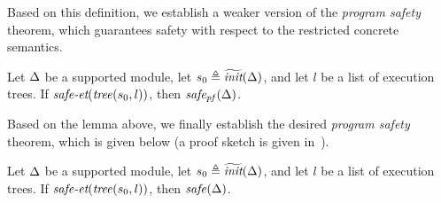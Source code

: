 Based on this definition,
we establish a weaker version of the \emph{program safety} theorem,
which guarantees safety with respect to the restricted concrete semantics.

\begin{lemma}
\label{lemma:safety-via-et-strict-ns}
Let $\Delta$ be a supported module, let $s_0 \triangleq \widetilde{\textit{init}}(\Delta)$, and let $l$ be a list of execution trees.
If $\textit{safe-et}(\mathit{tree}(s_0, l))$, then $\mathit{safe_{pf}}(\Delta)$.
\end{lemma}

Based on the lemma above, we finally establish the desired \emph{program safety} theorem,
which is given below (a proof sketch is given in~).

\begin{theorem}
\label{theorem:safety-via-et}
Let $\Delta$ be a supported module, let $s_0 \triangleq \widetilde{\textit{init}}(\Delta)$, and let $l$ be a list of execution trees.
If $\textit{safe-et}(\mathit{tree}(s_0, l))$, then $\mathit{safe}(\Delta)$.
\end{theorem}


